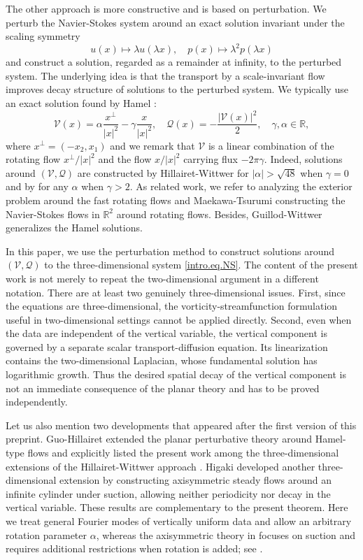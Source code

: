 \documentclass[11pt,a4paper]{article}
\numberwithin{equation}{section}
\newcommand{\R}{\mathbb{R}}
\begin{document}
The other approach is more constructive and is based on perturbation. We perturb the Navier-Stokes system around an exact solution invariant under the scaling symmetry 
\[
u(x) \mapsto \lambda u(\lambda x), 
\quad 
p(x) \mapsto \lambda^2 p(\lambda x) 
\]
and construct a solution, regarded as a remainder at infinity, to the perturbed system. The underlying idea is that the transport by a scale-invariant flow improves decay structure of solutions to the perturbed system. We typically use an exact solution found by Hamel \cite{Hamel1917}: 
\[
{\mathcal V}(x) 
=  
\alpha \frac{x^{\perp}}{|x|^2} - \gamma \frac{x}{|x|^2}, 
\quad 
{\mathcal Q}(x) = -\frac{|{\mathcal V}(x)|^2}{2}, 
\quad 
\gamma,\alpha\in\R, 
\]
where $x^\bot=(-x_2,x_1)$ and we remark that ${\mathcal V}$ is a linear combination of the rotating flow $x^{\perp}/|x|^2$ and the flow $x/|x|^2$ carrying flux $-2\pi\gamma$. Indeed, solutions around $({\mathcal V}, {\mathcal Q})$ are constructed by Hillairet-Wittwer \cite{HW2013} for $|\alpha|>\sqrt{48}$ when $\gamma=0$ and by \cite{Higaki2023} for any $\alpha$ when $\gamma>2$. As related work, we refer to \cite{GHM2019} analyzing the exterior problem around the fast rotating flows and Maekawa-Tsurumi \cite{MT2023} constructing the Navier-Stokes flows in $\R^2$ around rotating flows. Besides, Guillod-Wittwer \cite{GW2015} generalizes the Hamel solutions. 


In this paper, we use the perturbation method to construct solutions around $({\mathcal V}, {\mathcal Q})$ to the three-dimensional system \eqref{intro.eq.NS}. The content of the present work is not merely to repeat the two-dimensional argument in a different notation. There are at least two genuinely three-dimensional issues. First, since the equations are three-dimensional, the vorticity-streamfunction formulation useful in two-dimensional settings \cite{HW2013, Higaki2023, MT2023} cannot be applied directly. Second, even when the data are independent of the vertical variable, the vertical component is governed by a separate scalar transport-diffusion equation. Its linearization contains the two-dimensional Laplacian, whose fundamental solution has logarithmic growth. Thus the desired spatial decay of the vertical component is not an immediate consequence of the planar theory and has to be proved independently. 


Let us also mention two developments that appeared after the first version of this preprint. Guo-Hillairet \cite{GH2024} extended the planar perturbative theory around Hamel-type flows and explicitly listed the present work among the three-dimensional extensions of the Hillairet-Wittwer approach \cite{HW2013}. Higaki \cite{Higaki2025} developed another three-dimensional extension by constructing axisymmetric steady flows around an infinite cylinder under suction, allowing neither periodicity nor decay in the vertical variable. These results are complementary to the present theorem. Here we treat general Fourier modes of vertically uniform data and allow an arbitrary rotation parameter $\alpha$, whereas the axisymmetric theory in \cite{Higaki2025} focuses on suction and requires additional restrictions when rotation is added; see \cite[Appendix B]{Higaki2025}.
\end{document}
